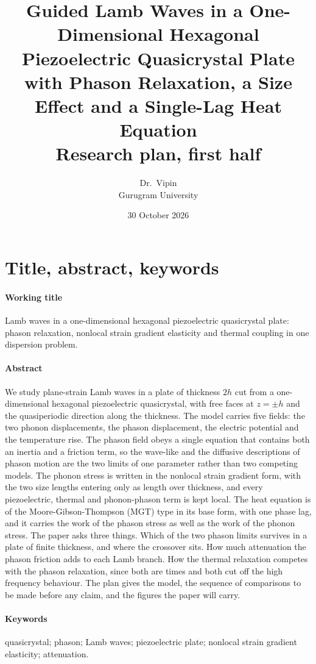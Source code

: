 \documentclass[11pt]{article}
\title{\vspace{-1.6cm}\Large Guided Lamb Waves in a One-Dimensional Hexagonal Piezoelectric Quasicrystal Plate\\[2pt]
\large with Phason Relaxation, a Size Effect and a Single-Lag Heat Equation\\[8pt]
\large Research plan, first half}
\author{Dr.\ Vipin \\ Gurugram University}
\date{30 October 2026}
\begin{document}
\maketitle
\vspace{-6mm}

\section{Title, abstract, keywords}

\paragraph{Working title} Lamb waves in a one-dimensional hexagonal piezoelectric quasicrystal plate:
phason relaxation, nonlocal strain gradient elasticity and thermal coupling in one dispersion problem.

\paragraph{Abstract} We study plane-strain Lamb waves in a plate of thickness $2h$ cut from a
one-dimensional hexagonal piezoelectric quasicrystal, with free faces at $z=\pm h$ and the quasiperiodic
direction along the thickness. The model carries five fields: the two phonon displacements, the phason
displacement, the electric potential and the temperature rise. The phason field obeys a single equation that
contains both an inertia and a friction term, so the wave-like and the diffusive descriptions of phason
motion are the two limits of one parameter rather than two competing models. The phonon stress is written in
the nonlocal strain gradient form, with the two size lengths entering only as length over thickness, and
every piezoelectric, thermal and phonon-phason term is kept local. The heat equation is of the Moore-Gibson-Thompson (MGT)
type in its base form, with one phase lag, and it carries the work of the phason stress as well as
the work of the phonon stress. The paper asks three things. Which of the two phason limits survives in a
plate of finite thickness, and where the crossover sits. How much attenuation the phason friction adds to
each Lamb branch. How the thermal relaxation competes with the phason relaxation, since both are times and
both cut off the high frequency behaviour. The plan gives the model, the sequence of comparisons to be made
before any claim, and the figures the paper will carry.

\paragraph{Keywords} quasicrystal; phason; Lamb waves; piezoelectric plate; nonlocal strain gradient
elasticity; attenuation.
\end{document}
